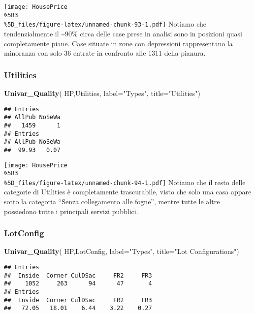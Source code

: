 \documentclass[
]{article}
\newenvironment{Shaded}{\begin{snugshade}}{\end{snugshade}}
\newcommand{\AttributeTok}[1]{\textcolor[rgb]{0.13,0.29,0.53}{#1}}
\newcommand{\FunctionTok}[1]{\textcolor[rgb]{0.13,0.29,0.53}{\textbf{#1}}}
\newcommand{\NormalTok}[1]{#1}
\newcommand{\StringTok}[1]{\textcolor[rgb]{0.31,0.60,0.02}{#1}}
\begin{document}
\texttt{[image: HousePrice\\\%5B3\\\%5D\_files/figure-latex/unnamed-chunk-93-1.pdf]}
Notiamo che tendenzialmente il \textasciitilde90\% circa delle case
prese in analisi sono in posizioni quasi completamente piane. Case
situate in zone con depressioni rappresentano la minoranza con solo 36
entrate in confronto alle 1311 della pianura.

\subsubsection{Utilities}\label{utilities}

\begin{Shaded}
\begin{Highlighting}[]
\FunctionTok{Univar\_Quality}\NormalTok{(}
\NormalTok{  HP,Utilities,}
  \AttributeTok{label=}\StringTok{"Types"}\NormalTok{,}
  \AttributeTok{title=}\StringTok{"Utilities"}\NormalTok{)}
\end{Highlighting}
\end{Shaded}

\begin{verbatim}
## Entries
## AllPub NoSeWa 
##   1459      1 
## Entries
## AllPub NoSeWa 
##  99.93   0.07
\end{verbatim}

\texttt{[image: HousePrice\\\%5B3\\\%5D\_files/figure-latex/unnamed-chunk-94-1.pdf]}
Notiamo che il resto delle categorie di Utilities è completamente
trascurabile, visto che solo una casa appare sotto la categoria ``Senza
collegamento alle fogne'', mentre tutte le altre possiedono tutte i
principali servizi pubblici.

\subsubsection{LotConfig}\label{lotconfig}

\begin{Shaded}
\begin{Highlighting}[]
\FunctionTok{Univar\_Quality}\NormalTok{(}
\NormalTok{  HP,LotConfig,}
  \AttributeTok{label=}\StringTok{"Types"}\NormalTok{,}
  \AttributeTok{title=}\StringTok{"Lot Configurations"}\NormalTok{)}
\end{Highlighting}
\end{Shaded}

\begin{verbatim}
## Entries
##  Inside  Corner CulDSac     FR2     FR3 
##    1052     263      94      47       4 
## Entries
##  Inside  Corner CulDSac     FR2     FR3 
##   72.05   18.01    6.44    3.22    0.27
\end{verbatim}
\end{document}
